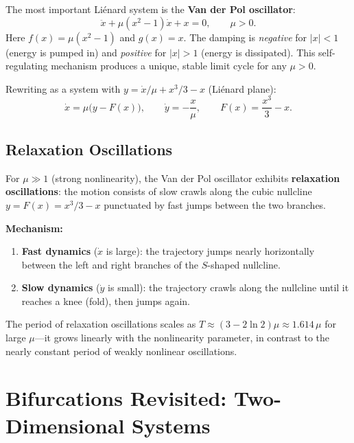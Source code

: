 \documentclass[11pt,letterpaper]{article}
\theoremstyle{definition}
\theoremstyle{plain}
\theoremstyle{remark}
\begin{document}
The most important Li\'enard system is the \textbf{Van der Pol oscillator}:
\begin{equation}\label{eq:vdp}
  \ddot{x} + \mu(x^2-1)\dot{x} + x = 0, \qquad \mu > 0.
\end{equation}
Here $f(x) = \mu(x^2-1)$ and $g(x) = x$.  The damping is
\emph{negative} for $|x|<1$ (energy is pumped in) and \emph{positive}
for $|x|>1$ (energy is dissipated).  This self-regulating mechanism
produces a unique, stable limit cycle for any $\mu > 0$.

Rewriting as a system with $y = \dot{x}/\mu + x^3/3 - x$ (Li\'enard
plane):
\begin{equation}
  \dot{x} = \mu\bigl(y - F(x)\bigr), \qquad \dot{y} = -\frac{x}{\mu},
  \qquad F(x) = \frac{x^3}{3} - x.
\end{equation}

\subsection{Relaxation Oscillations}\label{sec:relaxation}

For $\mu \gg 1$ (strong nonlinearity), the Van der Pol oscillator exhibits
\textbf{relaxation oscillations}: the motion consists of slow crawls along
the cubic nullcline $y = F(x) = x^3/3 - x$ punctuated by fast jumps
between the two branches.

\textbf{Mechanism:}
\begin{enumerate}[leftmargin=2em]
\item \textbf{Fast dynamics} ($\dot{x}$ is large): the trajectory jumps
      nearly horizontally between the left and right branches of the
      $S$-shaped nullcline.
\item \textbf{Slow dynamics} ($\dot{y}$ is small): the trajectory crawls
      along the nullcline until it reaches a knee (fold), then jumps again.
\end{enumerate}

The period of relaxation oscillations scales as $T \approx (3 - 2\ln 2)\mu
\approx 1.614\,\mu$ for large $\mu$---it grows linearly with the
nonlinearity parameter, in contrast to the nearly constant period of
weakly nonlinear oscillations.


\section{Bifurcations Revisited: Two-Dimensional Systems}%
\label{sec:bif-2d}
\end{document}

